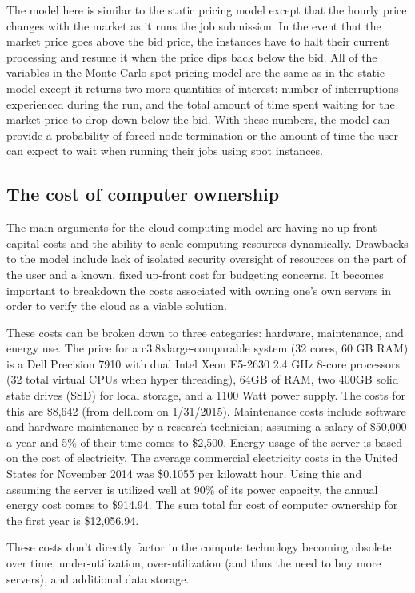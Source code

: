 \documentclass{frontiersSCNS} %
\begin{document}
The model here is similar to the static pricing model except that the hourly price changes with the market as it runs the job submission. In the event that the market price goes above the bid price, the instances have to halt their current processing and resume it when the price dips back below the bid. All of the variables in the Monte Carlo spot pricing model are the same as in the static model except it returns two more quantities of interest: number of interruptions experienced during the run, and the total amount of time spent waiting for the market price to drop down below the bid. With these numbers, the model can provide a probability of forced node termination or the amount of time the user can expect to wait when running their jobs using spot instances.

\subsection{The cost of computer ownership}
The main arguments for the cloud computing model are having no up-front capital costs and the ability to scale computing resources dynamically. Drawbacks to the model include lack of isolated security oversight of resources on the part of the user and a known, fixed up-front cost for budgeting concerns. It becomes important to breakdown the costs associated with owning one’s own servers in order to verify the cloud as a viable solution.


These costs can be broken down to three categories: hardware, maintenance, and energy use. The price for a c3.8xlarge-comparable system (32 cores, 60 GB RAM) is a Dell Precision 7910 with dual Intel Xeon E5-2630 2.4 GHz 8-core processors (32 total virtual CPUs when hyper threading), 64GB of RAM, two 400GB solid state drives (SSD) for local storage, and a 1100 Watt power supply. The costs for this are \$8,642 (from dell.com on 1/31/2015). Maintenance costs include software and hardware maintenance by a research technician; assuming a salary of \$50,000 a year and 5\% of their time comes to \$2,500. Energy usage of the server is based on the cost of electricity. The average commercial electricity costs in the United States for November 2014 was \$0.1055 per kilowatt hour. Using this and assuming the server is utilized well at 90\% of its power capacity, the annual energy cost comes to \$914.94. The sum total for cost of computer ownership for the first year is \$12,056.94.


These costs don’t directly factor in the compute technology becoming obsolete over time, under-utilization, over-utilization (and thus the need to buy more servers), and additional data storage.
\end{document}
